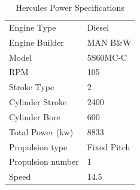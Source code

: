 \begin{table}[h!]
    \centering
    \caption{Hercules Power Specifications}
    \label{tab:hercules_power_specifications}
    \begin{tabular}{ll}
    \hline
    Engine Type       & Diesel      \\
    Engine Builder    & MAN B\&W    \\
    Model             & 5S60MC-C    \\
    RPM               & 105         \\
    Stroke Type       & 2           \\
    Cylinder Stroke   & 2400        \\
    Cylinder Bore     & 600         \\
    Total Power (kw)  & 8833        \\
    Propulsion type   & Fixed Pitch \\
    Propulsion number & 1           \\
    Speed             & 14.5       
    \end{tabular}
    \end{table}

        